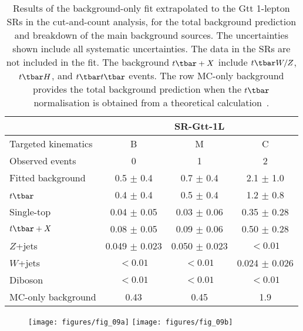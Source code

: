 \begin{table*}[htbp]
	\centering
	\begin{tabular}{lccc}
		\toprule
		& \multicolumn{3}{c}{SR-Gtt-1L} \\
		\midrule
		Targeted kinematics & B                 & M                 & C                 \\[-0.05cm]
		\midrule
		Observed events     & 0                 & 1                 & 2                 \\
		\midrule
		Fitted background   & 0.5 $\pm$ 0.4     & 0.7 $\pm$ 0.4     & 2.1 $\pm$ 1.0     \\
		\midrule
		$t\tbar$\           & 0.4 $\pm$ 0.4     & 0.5 $\pm$ 0.4     & 1.2 $\pm$ 0.8     \\
		Single-top          & 0.04 $\pm$ 0.05   & 0.03 $\pm$ 0.06   & 0.35 $\pm$ 0.28   \\
		$t\tbar+X$          & 0.08 $\pm$ 0.05   & 0.09 $\pm$ 0.06   & 0.50 $\pm$ 0.28   \\
		$Z$+jets            & 0.049 $\pm$ 0.023 & 0.050 $\pm$ 0.023 & $<0.01$           \\
		$W$+jets            & $<0.01$           & $<0.01$           & 0.024 $\pm$ 0.026 \\
		Diboson             & $<0.01$           & $<0.01$           & $<0.01$           \\
		\midrule
		MC-only background  & 0.43              & 0.45              & 1.9               \\
		\bottomrule
	\end{tabular}

	\caption{Results of the background-only fit extrapolated to the Gtt
		1-lepton SRs in the cut-and-count analysis, for the total background
		prediction and breakdown of the main background sources. The uncertainties
		shown include all systematic uncertainties. The data in the SRs are not
		included in the fit. The background $t\tbar+X$ include $t\tbar W/Z$,
		$t\tbar H$, and $t\tbar t\tbar$ events. The row MC-only background provides
		the total background prediction when the $t\tbar$ normalisation is obtained
		from a theoretical calculation~\cite{Czakon:2011xx}. }

	\label{tab:yield_discovery}

\end{table*}

\begin{figure}[H]
	\texttt{[image: figures/fig\_09a]}
	\texttt{[image: figures/fig\_09b]}
	\centering
	\caption{}
	\label{f:fig_09ab}
\end{figure}

